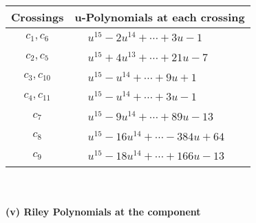 \documentclass[1p]{elsarticle_modified}
\theoremstyle{definition}
\begin{document}
\begin{tabular}{m{50pt}|m{274pt}}
Crossings & \hspace{64pt}u-Polynomials at each crossing \\
\hline $$\begin{aligned}c_{1},c_{6}\end{aligned}$$&$\begin{aligned}
&u^{15}-2 u^{14}+\cdots+3 u-1
\end{aligned}$\\
\hline $$\begin{aligned}c_{2},c_{5}\end{aligned}$$&$\begin{aligned}
&u^{15}+4 u^{13}+\cdots+21 u-7
\end{aligned}$\\
\hline $$\begin{aligned}c_{3},c_{10}\end{aligned}$$&$\begin{aligned}
&u^{15}- u^{14}+\cdots+9 u+1
\end{aligned}$\\
\hline $$\begin{aligned}c_{4},c_{11}\end{aligned}$$&$\begin{aligned}
&u^{15}- u^{14}+\cdots+3 u-1
\end{aligned}$\\
\hline $$\begin{aligned}c_{7}\end{aligned}$$&$\begin{aligned}
&u^{15}-9 u^{14}+\cdots+89 u-13
\end{aligned}$\\
\hline $$\begin{aligned}c_{8}\end{aligned}$$&$\begin{aligned}
&u^{15}-16 u^{14}+\cdots-384 u+64
\end{aligned}$\\
\hline $$\begin{aligned}c_{9}\end{aligned}$$&$\begin{aligned}
&u^{15}-18 u^{14}+\cdots+166 u-13
\end{aligned}$\\
\hline
\end{tabular}\\~\\
\newpage\renewcommand{\arraystretch}{1}
\flushleft \textbf{(v) Riley Polynomials at the component}\newline \\
\end{document}
